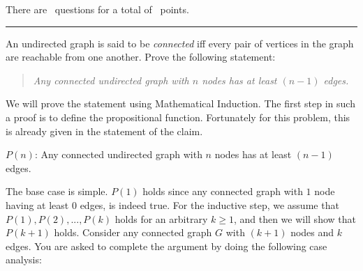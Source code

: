\documentclass{exam}
\begin{document}
\vspace{0.1in}
There are \numquestions\, questions for a total of \numpoints\, points.
\vspace{0.1in}
\hrule
 \vspace{0.2in}
\begin{questions}
 
\question An undirected graph is said to be {\em connected} iff every pair of vertices in the graph are reachable from one another. Prove the following statement:
\begin{quote}
{\it Any connected undirected graph with $n$ nodes has at least $(n-1)$ edges.}
\end{quote}

We will prove the statement using Mathematical Induction. The first step in such a proof is to define the propositional function. Fortunately for this problem, this is already given in the statement of the claim. 

$P(n)$: Any connected undirected graph with $n$ nodes has at least $(n-1)$ edges.

The base case is simple. $P(1)$ holds since any connected graph with $1$ node having at least $0$ edges, is indeed true. 
For the inductive step, we assume that $P(1), P(2), ..., P(k)$ holds for an arbitrary $k \geq 1$, and then we will show that $P(k+1)$ holds. Consider any connected graph $G$ with $(k+1)$ nodes and $k$ edges. You are asked to complete the argument by doing the following case analysis:

\end{questions}
\end{document}
